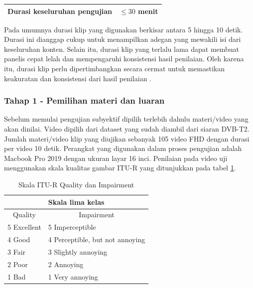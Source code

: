 \begin{table}[H]
\begin{tabular}{|l|c|}
		Durasi keseluruhan pengujian                                                                                                                                                  & $\le 30$  menit                                                             \\ \hline
	\end{tabular}
	
\end{table}

Pada umumnya durasi klip yang digunakan berkisar antara 5 hingga 10 detik. Durasi ini dianggap cukup untuk menampilkan adegan yang mewakili isi dari keseluruhan konten. Selain itu, durasi klip yang terlalu lama dapat membuat panelis cepat lelah dan mempengaruhi konsistensi hasil penilaian. Oleh karena itu, durasi klip perlu dipertimbangkan secara cermat untuk memastikan keakuratan dan konsistensi dari hasil penilaian \citep{IRB2019}.

\subsubsection{Tahap 1 - Pemilihan materi dan luaran}

\hspace{1,2cm}
Sebelum memulai pengujian subyektif dipilih terlebih dahulu materi/video yang akan dinilai. Video dipilih dari dataset yang sudah diambil dari siaran DVB-T2. Jumlah materi/video klip yang diujikan sebanyak 105 video FHD dengan durasi per video 10 detik. Perangkat yang digunakan dalam proses pengujian adalah Macbook Pro 2019 dengan ukuran layar 16 inci. Penilaian pada video uji menggunakan skala kualitas gambar ITU-R yang ditunjukkan pada tabel \ref{tabel-skala-quality}.   

\begin{table}[H]
	\centering
	\caption{Skala ITU-R Quality dan Impairment}
	\label{tabel-skala-quality}
	\begin{tabular}{|ll|}
		\hline
		\multicolumn{2}{|c|}{Skala lima kelas}                              \\ \hline
		\multicolumn{1}{|c|}{Quality}     & \multicolumn{1}{c|}{Impairment} \\ \hline
		\multicolumn{1}{|l|}{5 Excellent} & 5 Imperceptible                 \\ \hline
		\multicolumn{1}{|l|}{4 Good}      & 4 Perceptible, but not annoying \\ \hline
		\multicolumn{1}{|l|}{3 Fair}      & 3 Slightly annoying             \\ \hline
		\multicolumn{1}{|l|}{2 Poor}      & 2 Annoying                      \\ \hline
		\multicolumn{1}{|l|}{1 Bad}       & 1 Very annoying                 \\ \hline
	\end{tabular}
\end{table}

